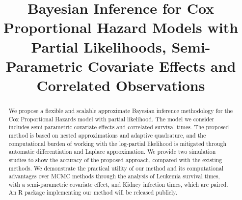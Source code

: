 \documentclass[ba]{imsart}
\begin{document}

\begin{frontmatter}
\title{Bayesian Inference for Cox Proportional Hazard Models with Partial Likelihoods, Semi-Parametric Covariate Effects and Correlated Observations}

\runtitle{}


\begin{abstract}
We propose a flexible and scalable approximate Bayesian inference methodology for the Cox Proportional Hazards model with partial likelihood. The model we consider includes semi-parametric covariate effects and correlated survival times. The proposed method is based on nested approximations and adaptive quadrature, and the computational burden of working with the log-partial likelihood is mitigated through automatic differentiation and Laplace approximation. We provide two simulation studies to show the accuracy of the proposed approach, compared with the existing methods. We demonstrate the practical utility of our method and its computational advantages over MCMC methods through the analysis of Leukemia survival times, with a semi-parametric covariate effect, and Kidney infection times, which are paired. An R package implementing our method will be released publicly.
\end{abstract}

\begin{keyword}
\end{keyword}

\end{frontmatter}
\end{document}
